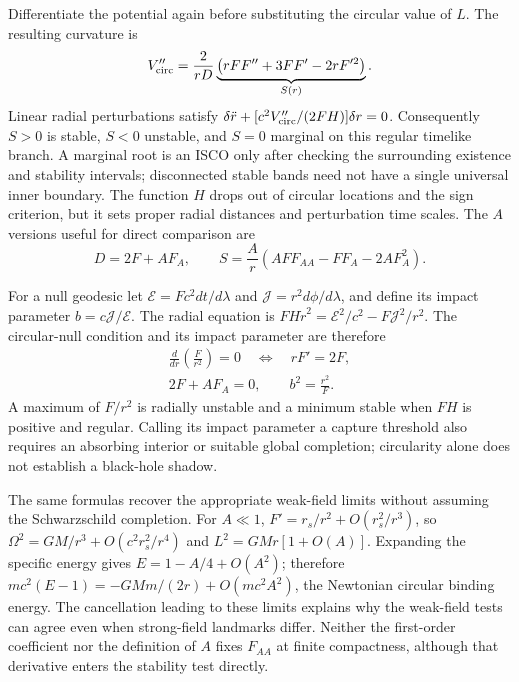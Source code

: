 \documentclass[10pt,twocolumn,letterpaper]{article}
\begin{document}
Differentiate the potential again before substituting the circular
value of $L$. The resulting curvature is
\begin{equation}
 V''_{\rm circ}=\frac{2}{rD}
 \underbrace{\left(rFF''+3FF'-2rF'^2\right)}_{S(r)}.
 \label{eq:orbit-stability}
\end{equation}
Linear radial perturbations satisfy
$\delta\ddot r+[c^2V''_{\rm circ}/(2FH)]\delta r=0$.
Consequently $S>0$ is stable, $S<0$ unstable, and $S=0$ marginal
on this regular timelike branch. A marginal root is an ISCO only after
checking the surrounding existence and stability intervals; disconnected
stable bands need not have a single universal inner boundary.
The function $H$ drops out of circular locations and the sign criterion,
but it sets proper radial distances and perturbation time scales.
The $A$ versions useful for direct comparison are
\begin{equation}
 D=2F+AF_A,\qquad
 S=\frac{A}{r}\left(AFF_{AA}-FF_A-2AF_A^2\right).
 \label{eq:orbit-A-criteria}
\end{equation}

For a null geodesic let $\mathcal E=Fc^2dt/d\lambda$ and
$\mathcal J=r^2d\phi/d\lambda$, and define its impact parameter
$b=c\mathcal J/\mathcal E$. The radial equation is
$FH\dot r^2=\mathcal E^2/c^2-F\mathcal J^2/r^2$.
The circular-null condition and its impact parameter are therefore
\begin{equation}
 \begin{gathered}
 \frac{d}{dr}\left(\frac{F}{r^2}\right)=0\quad\Longleftrightarrow\quad rF'=2F,\\
 2F+AF_A=0,\qquad b^2=\frac{r^2}{F}.
 \end{gathered}
 \label{eq:orbit-null-condition}
\end{equation}
A maximum of $F/r^2$ is radially unstable and a minimum stable when
$FH$ is positive and regular. Calling its impact parameter a capture
threshold also requires an absorbing interior or suitable global
completion; circularity alone does not establish a black-hole shadow.


The same formulas recover the appropriate weak-field limits without
assuming the Schwarzschild completion. For $A\ll1$,
$F'=r_s/r^2+O(r_s^2/r^3)$, so
$\Omega^2=GM/r^3+O(c^2r_s^2/r^4)$ and
$L^2=GMr[1+O(A)]$. Expanding the specific energy gives
$E=1-A/4+O(A^2)$; therefore
$mc^2(E-1)=-GMm/(2r)+O(mc^2A^2)$, the Newtonian circular binding
energy. The cancellation leading to these limits explains why the
weak-field tests can agree even when strong-field landmarks differ.
Neither the first-order coefficient nor the definition of $A$ fixes
$F_{AA}$ at finite compactness, although that derivative enters the
stability test directly.
\end{document}
